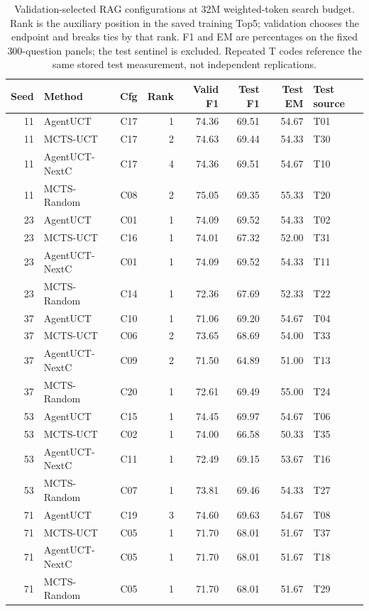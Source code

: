 \begin{table}[p]
\centering
\small
\setlength{\tabcolsep}{4pt}
\caption{Validation-selected RAG configurations at 32M weighted-token search budget. Rank is the auxiliary position in the saved training Top5; validation chooses the endpoint and breaks ties by that rank. F1 and EM are percentages on the fixed 300-question panels; the test sentinel is excluded. Repeated T codes reference the same stored test measurement, not independent replications.}
\label{tab:rag-best-configs-32m}
\begin{tabular}{@{}rlrrrrrl@{}}
\toprule
Seed & Method & Cfg & Rank & Valid F1 & Test F1 & Test EM & Test source \\
\midrule
11 & AgentUCT & C17 & 1 & 74.36 & 69.51 & 54.67 & T01 \\
11 & MCTS-UCT & C17 & 2 & 74.63 & 69.44 & 54.33 & T30 \\
11 & AgentUCT-NextC & C17 & 4 & 74.36 & 69.51 & 54.67 & T10 \\
11 & MCTS-Random & C08 & 2 & 75.05 & 69.35 & 55.33 & T20 \\
23 & AgentUCT & C01 & 1 & 74.09 & 69.52 & 54.33 & T02 \\
23 & MCTS-UCT & C16 & 1 & 74.01 & 67.32 & 52.00 & T31 \\
23 & AgentUCT-NextC & C01 & 1 & 74.09 & 69.52 & 54.33 & T11 \\
23 & MCTS-Random & C14 & 1 & 72.36 & 67.69 & 52.33 & T22 \\
37 & AgentUCT & C10 & 1 & 71.06 & 69.20 & 54.67 & T04 \\
37 & MCTS-UCT & C06 & 2 & 73.65 & 68.69 & 54.00 & T33 \\
37 & AgentUCT-NextC & C09 & 2 & 71.50 & 64.89 & 51.00 & T13 \\
37 & MCTS-Random & C20 & 1 & 72.61 & 69.49 & 55.00 & T24 \\
53 & AgentUCT & C15 & 1 & 74.45 & 69.97 & 54.67 & T06 \\
53 & MCTS-UCT & C02 & 1 & 74.00 & 66.58 & 50.33 & T35 \\
53 & AgentUCT-NextC & C11 & 1 & 72.49 & 69.15 & 53.67 & T16 \\
53 & MCTS-Random & C07 & 1 & 73.81 & 69.46 & 54.33 & T27 \\
71 & AgentUCT & C19 & 3 & 74.60 & 69.63 & 54.67 & T08 \\
71 & MCTS-UCT & C05 & 1 & 71.70 & 68.01 & 51.67 & T37 \\
71 & AgentUCT-NextC & C05 & 1 & 71.70 & 68.01 & 51.67 & T18 \\
71 & MCTS-Random & C05 & 1 & 71.70 & 68.01 & 51.67 & T29 \\
\bottomrule
\end{tabular}
\end{table}
